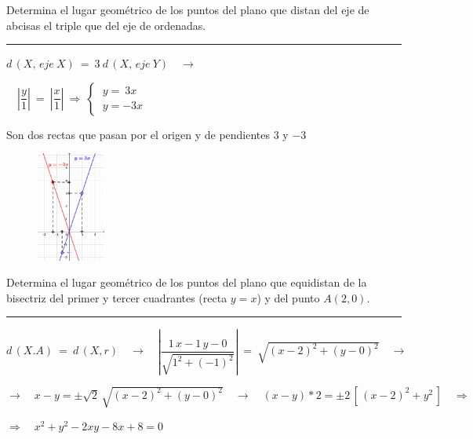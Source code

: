 \begin{miejercicio}

Determina el lugar geométrico de los puntos del plano que distan del eje de abcisas el triple que del eje de ordenadas.

\rule{250pt}{0.5pt}

\vspace{2mm} 
\begin{multicols}{2}
$d\,(X,\, eje\ X) \ =\ 3\ d\, (X,\, eje\ Y) \quad \to $

\vspace{5mm} $\quad \left| \dfrac y 1 \right| \ = \ \left| \dfrac x 1 \right| \ \Rightarrow \ \begin{cases} \ y=\ 3x \\ \ y=-3x \end{cases} $

\vspace{5mm} Son dos rectas que pasan por el origen y de pendientes $3$ y $-3$

\begin{figure}[H]
	\centering
	\includegraphics[width=0.2\textwidth]{img-lg/lg06.png}
\end{figure}
\end{multicols}
	
\end{miejercicio}

\begin{miejercicio}

Determina el lugar geométrico de los puntos del plano que equidistan de la bisectriz del primer y tercer cuadrantes (recta $y=x$) y del punto $A(2,0)$.

\rule{250pt}{0.5pt}

\vspace{2mm} $d\, (X.A) \ = \ d\, (X,r) \quad \to \quad \left| \dfrac{1\, x - 1\, y - 0}{\sqrt{1^2+(-1)^2}} \right|\ = \ \sqrt{(x-2)^2 +(y-0)^2}	\quad \to \quad $

\vspace{2mm} $\to \quad x-y=\pm \sqrt{2}\, \sqrt{(x-2)^2 +(y-0)^2}  \quad \to \quad (x-y)*2 =\pm 2\, [\, (x-2)^2 +y^2 \,] \quad \Rightarrow $

\vspace{2mm} $ \Rightarrow \quad x^2+y^2-2xy-8x+8=0 $
\end{miejercicio}

